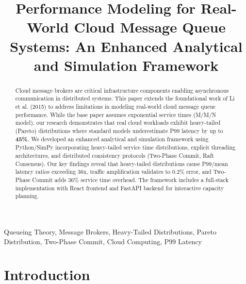 \documentclass[conference,twocolumn]{IEEEtran}
\begin{document}
\title{Performance Modeling for Real-World Cloud Message Queue Systems: An Enhanced Analytical and Simulation Framework}

\author{
\and
{}
}

\maketitle

\begin{abstract}
Cloud message brokers are critical infrastructure components enabling asynchronous communication in distributed systems. This paper extends the foundational work of Li et al. (2015) to address limitations in modeling real-world cloud message queue performance. While the base paper assumes exponential service times (M/M/N model), our research demonstrates that real cloud workloads exhibit heavy-tailed (Pareto) distributions where standard models underestimate P99 latency by up to \textbf{45\%}. We developed an enhanced analytical and simulation framework using Python/SimPy incorporating heavy-tailed service time distributions, explicit threading architectures, and distributed consistency protocols (Two-Phase Commit, Raft Consensus). Our key findings reveal that heavy-tailed distributions cause P99/mean latency ratios exceeding 36x, traffic amplification validates to 0.2\% error, and Two-Phase Commit adds 36\% service time overhead. The framework includes a full-stack implementation with React frontend and FastAPI backend for interactive capacity planning.
\end{abstract}

\begin{IEEEkeywords}
Queueing Theory, Message Brokers, Heavy-Tailed Distributions, Pareto Distribution, Two-Phase Commit, Cloud Computing, P99 Latency
\end{IEEEkeywords}

\section{Introduction}
\end{document}
